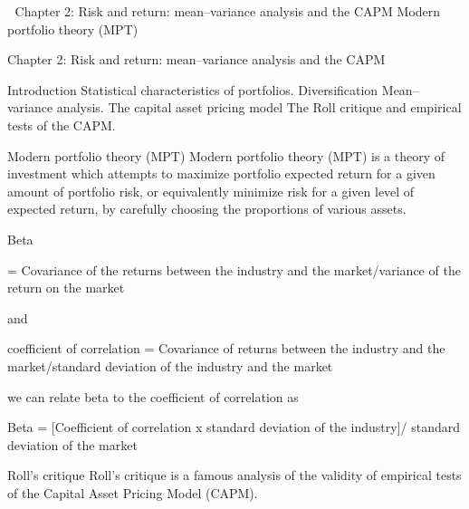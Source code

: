 

Chapter 2: Risk and return: mean–variance analysis and the CAPM
Modern portfolio theory (MPT)

Chapter 2: Risk and return: mean–variance analysis and the CAPM

Introduction
Statistical characteristics of portfolios.
Diversification
Mean–variance analysis. 
The capital asset pricing model 
The Roll critique and empirical tests of the CAPM.


Modern portfolio theory (MPT)
Modern portfolio theory (MPT) is a theory of investment which attempts to maximize portfolio expected return for a given amount of portfolio risk, or equivalently minimize risk for a given level of expected return, by carefully choosing the proportions of various assets. 

Beta

= Covariance of the returns between the industry and the market/variance of the return on the market 

and 

coefficient of correlation = Covariance of returns between the industry and the market/standard deviation of the industry and the market 

we can relate beta to the coefficient of correlation as

Beta = [Coefficient of correlation x standard deviation of the industry]/ standard deviation of the market


Roll's critique
Roll's critique is a famous analysis of the validity of empirical tests of the Capital Asset Pricing Model (CAPM).
